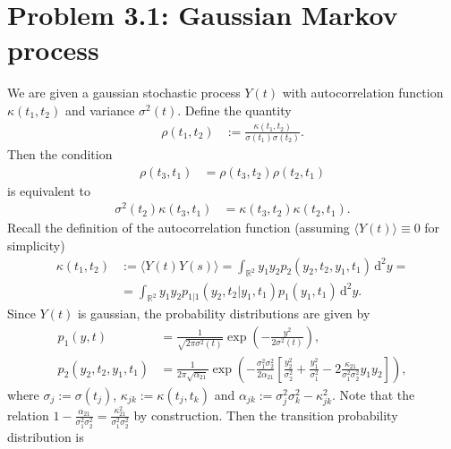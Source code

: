 \documentclass[english, parskip=full]{scrartcl}
\title{\titel}
\author{\autor}
\date{\today}
\newcommand{\bra}{}
\newcommand{\intr}{}
\newcommand{\kla}{}
\newcommand{\klam}{}
\begin{document}
\maketitle  %

\section*{Problem 3.1: Gaussian Markov process}
We are given a gaussian stochastic process $Y(t)$ with autocorrelation function $\kappa(t_1,t_2)$ and variance $\sigma^2(t)$.
Define the quantity
\begin{align}
\rho(t_1,t_2) & := \frac{\kappa(t_1,t_2)}{\sigma(t_1)\sigma(t_2)}.
\end{align}
Then the condition
\begin{align}
\rho(t_3,t_1) &= \rho(t_3,t_2)\rho(t_2,t_1)
\end{align}
is equivalent to
\begin{align}
\sigma^2(t_2)\kappa(t_3,t_1) &= \kappa(t_3,t_2)\kappa(t_2,t_1).
\end{align}
Recall the definition of the autocorrelation function (assuming $\bra\langle Y(t) \rangle\equiv 0$ for simplicity)
\begin{align}
\kappa (t_1,t_2) &:=\bra\langle Y(t)Y(s) \rangle = \intr\int_{\mathbb{R}^{2}} y_1y_2p_2(y_2,t_2,y_1,t_1) \, \mathrm{d}^{2}y = \\
&=\intr\int_{\mathbb{R}^{2}} y_1y_2p_{1|1}(y_2,t_2|y_1,t_1)p_1(y_1,t_1) \, \mathrm{d}^{2}y.
\end{align}
Since $Y(t)$ is gaussian, the probability distributions are given by
\begin{align}
p_1(y,t) &= \frac{1}{\sqrt{2\pi\sigma^2(t)}}\exp\kla\left( -\frac{y^2}{2\sigma^2(t)} \right),\\
p_2(y_2,t_2,y_1,t_1) &= \frac{1}{2\pi\sqrt{\alpha_{21}}}\exp \kla\left( -\frac{\sigma_1^2\sigma_2^2}{2\alpha_{21}}\klam\left[ \frac{y_2^2}{\sigma_2^2} + \frac{y_1^2}{\sigma_1^2} - 2\frac{\kappa_{21}}{\sigma_1^2\sigma_2^2}y_1y_2 \right] \right),
\end{align}
where $\sigma_j := \sigma(t_j)$, $\kappa_{jk} :=\kappa(t_j,t_k)$ and $\alpha_{jk} := \sigma_j^2\sigma_k^2 - \kappa_{jk}^2$.
Note that the relation $1 - \frac{\alpha_{21}}{\sigma_1^2\sigma_2^2} = \frac{\kappa_{21}^2}{\sigma_1^2\sigma_2^2}$ by construction.
Then the transition probability distribution is
\end{document}

